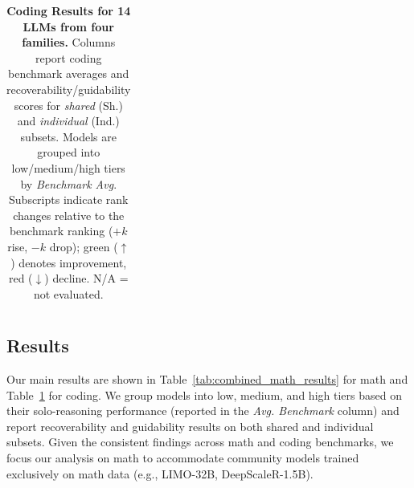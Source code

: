 \documentclass{article} %
\begin{document}
\begin{table}[t]
\begin{tabular}{r|c|c|cc|cc}
    \bottomrule
  \end{tabular}
  \caption{\textbf{Coding Results for 14 LLMs from four families.} Columns report coding benchmark averages and recoverability/guidability scores for \emph{shared} (Sh.) and \emph{individual} (Ind.) subsets. Models are grouped into low/medium/high tiers by \textit{Benchmark Avg}. Subscripts indicate rank changes relative to the benchmark ranking ($+k$ rise, $-k$ drop); green ($\uparrow$) denotes improvement, red ($\downarrow$) decline. N/A = not evaluated.}
  \label{tab:combined_coding_results}
\end{table}

\subsection{Results}
\label{sec:evaluation_findings}
Our main results are shown in Table~\ref{tab:combined_math_results} for math and Table~\ref{tab:combined_coding_results} for coding. We group models into low, medium, and high tiers based on their solo-reasoning performance (reported in the \textit{Avg. Benchmark} column) and report recoverability and guidability results on both shared and individual subsets. Given the consistent findings across math and coding benchmarks, we focus our analysis on math to accommodate community models trained exclusively on math data (e.g., LIMO-32B, DeepScaleR-1.5B).
    

\captionsetup[figure]{aboveskip=2pt, belowskip=4pt}
\captionsetup[table]{aboveskip=2pt, belowskip=4pt}
\end{document}
